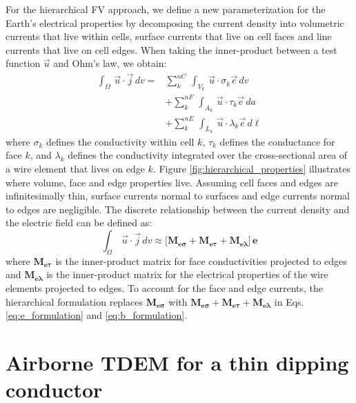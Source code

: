 \documentclass{segabs}
\begin{document}
For the hierarchical FV approach, we define a new parameterization for the Earth's electrical properties by decomposing the current density into volumetric currents that live within cells, surface currents that live on cell faces and line currents that live on cell edges. When taking the inner-product between a test function $\vec{u}$ and Ohm's law, we obtain:
\begin{equation}
\begin{split}
\label{eq:sum}
\int_\Omega \, \vec{u} \cdot \vec{j} \,  dv = & \sum_k^{nC} \, \int_{V_k} \, \vec{u} \cdot \sigma_k \vec{e} \, dv \\
&+ \sum_k^{nF} \, \int_{A_k} \, \vec{u} \cdot \tau_k \vec{e} \, da \\
&+ \sum_k^{nE} \, \int_{L_k} \, \vec{u} \cdot \lambda_k \vec{e} \, d\ell
\end{split}
\end{equation}
where $\sigma_k$ defines the conductivity within cell $k$, $\tau_k$ defines the conductance for face $k$, and $\lambda_k$ defines the conductivity integrated over the cross-sectional area of a wire element that lives on edge $k$. Figure \ref{fig:hierarchical_properties} illustrates where volume, face and edge properties live. Assuming cell faces and edges are infinitesimally thin, surface currents normal to surfaces and edge currents normal to edges are negligible. The discrete relationship between the current density and the electric field can be defined as:
\begin{equation}
\label{eq:hierarchical}
\int_\Omega \, \vec{u} \cdot \vec{j} \,  dv \approx \big [ \mathbf{M_{e\sigma} + M_{e\tau} + M_{e\lambda}} \big ] \, \mathbf{e}
\end{equation}
where $\mathbf{M_{e\tau}}$ is the inner-product matrix for face conductivities projected to edges and $\mathbf{M_{e\lambda}}$ is the inner-product matrix for the electrical properties of the wire elements projected to edges. To account for the face and edge currents, the hierarchical formulation replaces $\mathbf{M_{e\sigma}}$ with $\mathbf{M_{e\sigma}+M_{e\tau}+M_{e\lambda}}$ in Eqs. \ref{eq:e_formulation} and \ref{eq:b_formulation}.



\section{Airborne TDEM for a thin dipping conductor}
\end{document}
